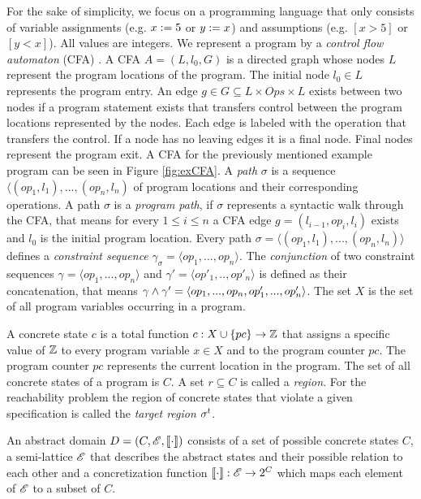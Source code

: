 For the sake of simplicity, we focus on a programming language that only consists of variable assignments (e.g. $x := 5$ or $y := x$) and assumptions (e.g. $[x > 5]$ or $[y < x]$).
All values are integers.
We represent a program by a \emph{control flow automaton} (CFA) \cite{BeyerBook}\cite{Beyer2012}.
A CFA $A = (L, l_0, G)$ is a directed graph whose nodes $L$ represent the program locations of the program.
The initial node $l_0 \in L$ represents the program entry.
An edge $g \in G \subseteq L \times Ops \times L$ exists between two nodes if a program statement exists that transfers control between the program locations represented by the nodes.
Each edge is labeled with the operation that transfers the control.
If a node has no leaving edges it is a final node. Final nodes represent the program exit.
A CFA for the previously mentioned example program can be seen in Figure \ref{fig:exCFA}.
A \emph{path} $\sigma$ \cite{Beyer2015} is a sequence $\langle (op_1, l_1), ..., (op_n, l_n)$ of program locations and their corresponding operations.
A path $\sigma$ is a \emph{program path}, if $\sigma$ represents a syntactic walk through the CFA, that means for every $1 \leq i \leq n$ a CFA edge $g = (l_{i-1}, op_i, l_i)$ exists and $l_0$ is the initial program location.
Every path $\sigma = \langle (op_1, l_1), ..., (op_n, l_n) \rangle$ defines a \emph{constraint sequence} $\gamma_\sigma = \langle op_1, ..., op_n \rangle$.
The \emph{conjunction} of two constraint sequences $\gamma = \langle op_1, ..., op_n \rangle$ and $\gamma' = \langle op'_1, .., op'_n \rangle$ is defined as their concatenation,
that means $\gamma \wedge \gamma' = \langle op_1, ..., op_n, op'_1, ..., op'_n \rangle$.
The set $X$ is the set of all program variables occurring in a program.

A concrete state $c$ is a total function $c: X \cup \{pc\} \rightarrow \mathbb{Z}$ that assigns a specific value of $\mathbb{Z}$ to every program variable $x \in X$ and to the program counter $pc$. The program counter $pc$ represents the current location in the program.
The set of all concrete states of a program is $C$. A set $r \subseteq C$ is called a \emph{region}.
For the reachability problem the region of concrete states that violate a given specification is called the \emph{target region} $\sigma^{t}$.

An abstract domain \cite{Beyer2007} $D = (C, \mathscr{E}, \llbracket \cdot \rrbracket)$ consists of a set of possible concrete states $C$, a semi-lattice $\mathscr{E}$ that describes the abstract states and their possible relation to each other and a concretization function $\llbracket \cdot \rrbracket : \mathscr{E} \rightarrow 2^C$ which maps each element of $\mathscr{E}$ to a subset of $C$.

